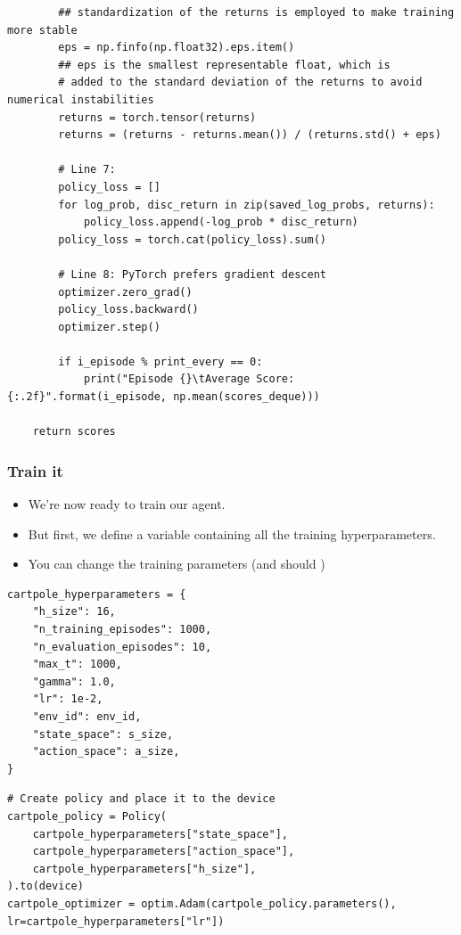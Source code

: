 \documentclass[11pt,a4paper]{article}
\begin{document}
\begin{lstlisting}
        ## standardization of the returns is employed to make training more stable
        eps = np.finfo(np.float32).eps.item()
        ## eps is the smallest representable float, which is
        # added to the standard deviation of the returns to avoid numerical instabilities
        returns = torch.tensor(returns)
        returns = (returns - returns.mean()) / (returns.std() + eps)

        # Line 7:
        policy_loss = []
        for log_prob, disc_return in zip(saved_log_probs, returns):
            policy_loss.append(-log_prob * disc_return)
        policy_loss = torch.cat(policy_loss).sum()

        # Line 8: PyTorch prefers gradient descent
        optimizer.zero_grad()
        policy_loss.backward()
        optimizer.step()

        if i_episode % print_every == 0:
            print("Episode {}\tAverage Score: {:.2f}".format(i_episode, np.mean(scores_deque)))

    return scores
\end{lstlisting}

\subsubsection{Train it}\label{train-it}

\begin{itemize}
\tightlist
\item
  We're now ready to train our agent.
\item
  But first, we define a variable containing all the training hyperparameters.
\item
  You can change the training parameters (and should )
\end{itemize}

\begin{lstlisting}
cartpole_hyperparameters = {
    "h_size": 16,
    "n_training_episodes": 1000,
    "n_evaluation_episodes": 10,
    "max_t": 1000,
    "gamma": 1.0,
    "lr": 1e-2,
    "env_id": env_id,
    "state_space": s_size,
    "action_space": a_size,
}
\end{lstlisting}

\begin{lstlisting}
# Create policy and place it to the device
cartpole_policy = Policy(
    cartpole_hyperparameters["state_space"],
    cartpole_hyperparameters["action_space"],
    cartpole_hyperparameters["h_size"],
).to(device)
cartpole_optimizer = optim.Adam(cartpole_policy.parameters(), lr=cartpole_hyperparameters["lr"])
\end{lstlisting}
\end{document}

